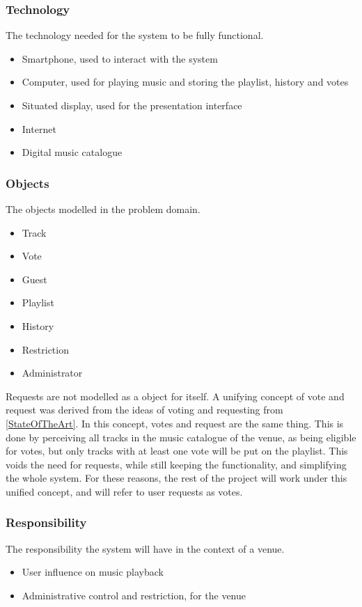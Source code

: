 \subsubsection{Technology}
The technology needed for the system to be fully functional.
\begin{itemize}
    \item Smartphone, used to interact with the system
    \item Computer, used for playing music and storing the playlist, history and votes
		\item Situated display, used for the presentation interface
    \item Internet
    \item Digital music catalogue
\end{itemize}

\subsubsection{Objects}
\label{FACTORObjects}
The objects modelled in the problem domain.
\begin{itemize}
  \item Track
  \item Vote
  \item Guest
  \item Playlist
  \item History
  \item Restriction
  \item Administrator
\end{itemize}
Requests are not modelled as a object for itself. A unifying concept of vote and request was derived from the ideas of voting and requesting from \cref{StateOfTheArt}. In this concept, votes and request are the same thing. This is done by perceiving all tracks in the music catalogue of the venue, as being eligible for votes, but only tracks with at least one vote will be put on the playlist. This voids the need for requests, while still keeping the functionality, and simplifying the whole system. For these reasons, the rest of the project will work under this unified concept, and will refer to user requests as votes.

\subsubsection{Responsibility}
The responsibility the system will have in the context of a venue.
\begin{itemize}
  \item User influence on music playback
  \item Administrative control and restriction, for the venue
\end{itemize}

